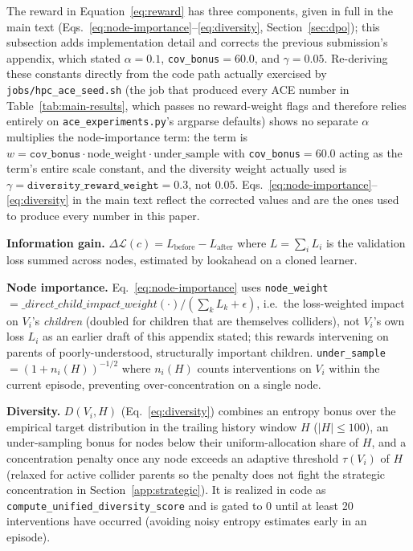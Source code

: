 \documentclass[twoside]{article}
\theoremstyle{plain}
\theoremstyle{definition}
\theoremstyle{remark}
\begin{document}
The reward in Equation~\eqref{eq:reward} has three components, given in full in the main text (Eqs.~\ref{eq:node-importance}--\ref{eq:diversity}, Section~\ref{sec:dpo}); this subsection adds implementation detail and corrects the previous submission's appendix, which stated $\alpha=0.1$, \texttt{cov\_bonus}$=60.0$, and $\gamma=0.05$. Re-deriving these constants directly from the code path actually exercised by \texttt{jobs/hpc\_ace\_seed.sh} (the job that produced every ACE number in Table~\ref{tab:main-results}, which passes no reward-weight flags and therefore relies entirely on \texttt{ace\_experiments.py}'s argparse defaults) shows no separate $\alpha$ multiplies the node-importance term: the term is $w = \texttt{cov\_bonus} \cdot \text{node\_weight} \cdot \text{under\_sample}$ with \texttt{cov\_bonus}$=60.0$ acting as the term's entire scale constant, and the diversity weight actually used is $\gamma=\texttt{diversity\_reward\_weight}=0.3$, not $0.05$. Eqs.~\ref{eq:node-importance}--\ref{eq:diversity} in the main text reflect the corrected values and are the ones used to produce every number in this paper.

\textbf{Information gain.} $\Delta\mathcal{L}(c) = L_\text{before} - L_\text{after}$ where $L = \sum_i L_i$ is the validation loss summed across nodes, estimated by lookahead on a cloned learner.

\textbf{Node importance.} Eq.~\ref{eq:node-importance} uses \texttt{node\_weight}$= \_direct\_child\_impact\_weight(\cdot)/(\sum_k L_k + \epsilon)$, i.e.\ the loss-weighted impact on $V_i$'s \emph{children} (doubled for children that are themselves colliders), not $V_i$'s own loss $L_i$ as an earlier draft of this appendix stated; this rewards intervening on parents of poorly-understood, structurally important children. \texttt{under\_sample}$=(1+n_i(H))^{-1/2}$ where $n_i(H)$ counts interventions on $V_i$ within the current episode, preventing over-concentration on a single node.

\textbf{Diversity.} $D(V_i, H)$ (Eq.~\ref{eq:diversity}) combines an entropy bonus over the empirical target distribution in the trailing history window $H$ ($|H|\le 100$), an under-sampling bonus for nodes below their uniform-allocation share of $H$, and a concentration penalty once any node exceeds an adaptive threshold $\tau(V_i)$ of $H$ (relaxed for active collider parents so the penalty does not fight the strategic concentration in Section~\ref{app:strategic}). It is realized in code as \texttt{compute\_unified\_diversity\_score} and is gated to $0$ until at least 20 interventions have occurred (avoiding noisy entropy estimates early in an episode).
\end{document}
